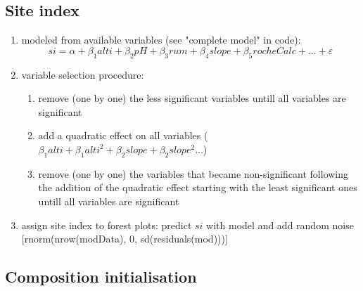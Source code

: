 \documentclass[a4paper]{article}
\begin{document}
\subsection*{Site index}
\begin{enumerate}
    \item modeled from available variables (see "complete model" in code):
    \begin{equation}\label{si}
    si = \alpha + \beta_1 alti + \beta_2 pH +\beta_3 rum +\beta_4 slope +\beta_5 rocheCalc+...+\varepsilon \end{equation}
    \item variable selection procedure:
    \begin{enumerate}
        \item remove (one by one) the less significant variables untill all variables are significant
        \item add a quadratic effect on all variables ($\beta_1alti + \beta_1alti^2 + \beta_2slope + \beta_2slope^2...$)
        \item remove (one by one) the variables that became non-significant following the addition of the quadratic effect starting with the least significant ones  untill all variables are significant
\end{enumerate}
    \item assign site index to forest plots: predict $si$ with model and add random noise   [rnorm(nrow(modData), 0, sd(residuals(mod)))]
\end{enumerate}

\subsection*{Composition initialisation}
\end{document}
